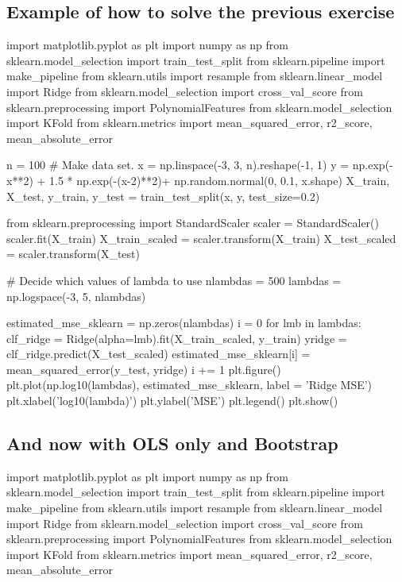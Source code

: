 \documentclass[%
oneside,                 %
final,                   %
10pt]{article}
\begin{document}
\noindent
\subsection{Example of how to solve the previous exercise}

\bpycod
import matplotlib.pyplot as plt
import numpy as np
from sklearn.model_selection import train_test_split
from sklearn.pipeline import make_pipeline
from sklearn.utils import resample
from sklearn.linear_model import Ridge
from sklearn.model_selection import cross_val_score
from sklearn.preprocessing import PolynomialFeatures
from sklearn.model_selection import KFold
from sklearn.metrics import mean_squared_error, r2_score, mean_absolute_error

n = 100
# Make data set.
x = np.linspace(-3, 3, n).reshape(-1, 1)
y = np.exp(-x**2) + 1.5 * np.exp(-(x-2)**2)+ np.random.normal(0, 0.1, x.shape)
X_train, X_test, y_train, y_test = train_test_split(x, y, test_size=0.2)

from sklearn.preprocessing import StandardScaler
scaler = StandardScaler()
scaler.fit(X_train)
X_train_scaled = scaler.transform(X_train)
X_test_scaled = scaler.transform(X_test)



# Decide which values of lambda to use
nlambdas = 500
lambdas = np.logspace(-3, 5, nlambdas)


estimated_mse_sklearn = np.zeros(nlambdas)
i = 0
for lmb in lambdas:
    clf_ridge = Ridge(alpha=lmb).fit(X_train_scaled, y_train)
    yridge = clf_ridge.predict(X_test_scaled)
    estimated_mse_sklearn[i] = mean_squared_error(y_test, yridge)
    i += 1
plt.figure()
plt.plot(np.log10(lambdas), estimated_mse_sklearn, label = 'Ridge MSE')
plt.xlabel('log10(lambda)')
plt.ylabel('MSE')
plt.legend()
plt.show()

\epycod

\subsection{And now with OLS only and Bootstrap}

\bpycod

import matplotlib.pyplot as plt
import numpy as np
from sklearn.model_selection import train_test_split
from sklearn.pipeline import make_pipeline
from sklearn.utils import resample
from sklearn.linear_model import Ridge
from sklearn.model_selection import cross_val_score
from sklearn.preprocessing import PolynomialFeatures
from sklearn.model_selection import KFold
from sklearn.metrics import mean_squared_error, r2_score, mean_absolute_error
\end{document}
